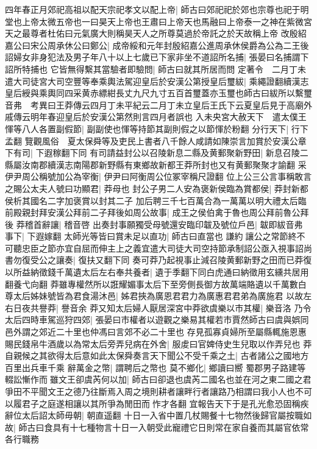 四年春正月郊祀高祖以配天宗祀孝文以配上帝|{
	師古曰郊祀祀於郊也宗尊也祀于明堂也上帝太微五帝也一曰昊天上帝也王肅曰上帝天也馬融曰上帝泰一之神在紫微宮天之最尊者杜佑曰元氣廣大則稱昊天人之所尊莫過於帝託之於天故稱上帝}
改殷紹嘉公曰宋公周承休公曰鄭公|{
	成帝綏和元年封殷紹嘉公進周承休侯爵為公為二王後}
詔婦女非身犯法及男子年八十以上七歲已下家非坐不道詔所名捕|{
	張晏曰名捕謂下詔所特捕也}
它皆無得繫其當驗者即驗問|{
	師古曰就其所居而問}
定著令　二月丁未遣大司徒宮大司空豐等奉乘輿法駕迎皇后於安漢公第授皇后璽紱|{
	乘繩證翻續漢志皇后綬與乘輿同四采黄赤縹紺長丈九尺九寸五百首璽蓋亦玉璽也師古曰紱所以繫璽音弗　考異曰王莽傳云四月丁未平紀云二月丁未立皇后王氏下云夏皇后見于高廟外戚傳云明年春迎皇后於安漢公第然則言四月者誤也}
入未央宮大赦天下　遣太僕王惲等八人各置副假節|{
	副副使也惲等持節其副則假之以節惲於粉翻}
分行天下|{
	行下孟翻}
覽觀風俗　夏太保舜等及吏民上書者八千餘人咸請如陳崇言加賞於安漢公章下有司|{
	下遐稼翻下同}
有司請益封公以召陵新息二縣及黄郵聚新野田|{
	新息召陵二縣屬汝南郡續漢志南陽郡新野縣有東鄉故新都王莽所封也又有黄郵聚聚才諭翻}
采伊尹周公稱號加公為宰衡|{
	伊尹曰阿衡周公位冢宰稱尺證翻}
位上公三公言事稱敢言之賜公太夫人號曰功顯君|{
	莽母也}
封公子男二人安為褒新侯臨為賞都侯|{
	莽封新都侯析其國名二字加褒賞以封其二子}
加后聘三千七百萬合為一萬萬以明大禮太后臨前殿親封拜安漢公拜前二子拜後如周公故事|{
	成王之侯伯禽于魯也周公拜前魯公拜後}
莽稽首辭讓|{
	稽音啓}
出奏封事願獨受母號還安臨印韍及號位戶邑|{
	韍即紱音弗}
事下|{
	下遐嫁翻}
太師光等皆曰賞未足以直功|{
	師古曰直當也}
謙約讓公之常節終不可聽忠臣之節亦宜自屈而伸主上之義宜遣大司徒大司空持節承制詔公亟入視事詔尚書勿復受公之讓奏|{
	復扶又翻下同}
奏可莽乃起視事止減召陵黄郵新野之田而已莽復以所益納徵錢千萬遺太后左右奉共養者|{
	遺于季翻下同白虎通曰納徵用玄纁共居用翻養弋向翻}
莽雖專權然所以誑耀媚事太后下至旁側長御方故萬端賂遺以千萬數白尊太后姊妹號皆為君食湯沐邑|{
	姊君挾為廣恩君君力為廣惠君君弟為廣施君}
以故左右日夜共譽莽|{
	譽音余}
莽又知太后婦人厭居深宮中莽欲虞樂以市其權|{
	樂音洛}
乃令太后四時車駕巡狩四郊|{
	張晏曰市權者以遊觀之樂易其權若市賈然師古曰虞與娯同邑外謂之郊近二十里也仲馮曰言郊不必二十里也}
存見孤寡貞婦所至屬縣輒施恩惠賜民錢帛牛酒歲以為常太后旁弄兒病在外舍|{
	服䖍曰官婢侍史生兒取以作弄兒也}
莽自親候之其欲得太后意如此太保舜奏言天下聞公不受千乘之土|{
	古者諸公之國地方百里出兵車千乘}
辭萬金之幣|{
	謂聘后之幣也}
莫不鄉化|{
	鄉讀曰嚮}
蜀郡男子路建等輟訟慚作而雖文王卻虞芮何以加|{
	師古曰卻退也虞芮二國名也並在河之東二國之君爭田不平聞文王之德乃往斷焉入周之境則耕者讓畔行者讓路乃相謂曰我小人也不可以履君子之庭遂相讓以其所爭為閒田而怍才各翻}
宜報告天下于是孔光愈恐固稱疾辭位太后詔太師毋朝|{
	朝直遥翻}
十日一入省中置几杖賜餐十七物然後歸官屬按職如故|{
	師古曰食具有十七種物言十日一入朝受此寵禮它日則常在家自養而其屬官依常各行職務}
